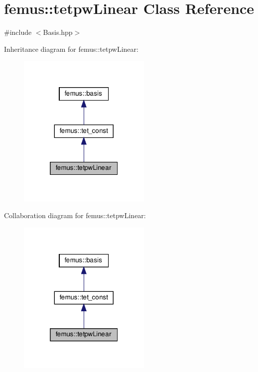 \hypertarget{classfemus_1_1tetpw_linear}{}\section{femus\+:\+:tetpw\+Linear Class Reference}
\label{classfemus_1_1tetpw_linear}


{\ttfamily \#include $<$Basis.\+hpp$>$}



Inheritance diagram for femus\+:\+:tetpw\+Linear\+:
\nopagebreak
\begin{figure}[H]
\begin{center}
\leavevmode
\includegraphics[width=181pt]{classfemus_1_1tetpw_linear__inherit__graph}
\end{center}
\end{figure}


Collaboration diagram for femus\+:\+:tetpw\+Linear\+:
\nopagebreak
\begin{figure}[H]
\begin{center}
\leavevmode
\includegraphics[width=181pt]{classfemus_1_1tetpw_linear__coll__graph}
\end{center}
\end{figure}
